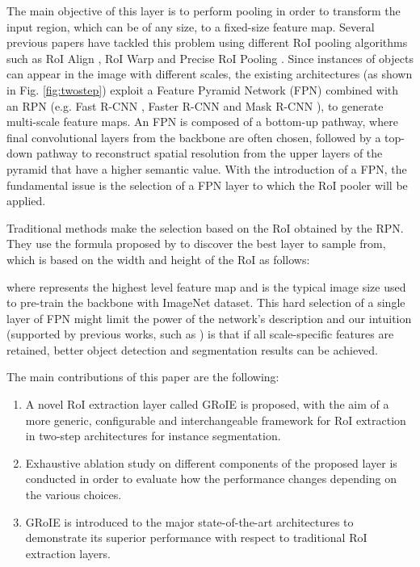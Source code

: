 \documentclass[10pt,conference,a4paper]{IEEEtran}
\begin{document}
The main objective of this layer is to perform pooling in order to transform the input region, which can be of any size, to a fixed-size feature map.
Several previous papers have tackled this problem using different RoI pooling algorithms such as RoI Align \cite{he2017mask}, RoI Warp \cite{dai2016instance} and Precise RoI Pooling \cite{jiang2018acquisition}.
Since instances of objects can appear in the image with different scales, the existing architectures (as shown in Fig. \ref{fig:twostep}) exploit a Feature Pyramid Network (FPN) \cite{lin2017feature} combined with an RPN  (e.g. Fast R-CNN \cite{girshick2015fast}, Faster R-CNN \cite{ren2015faster} and Mask R-CNN \cite{he2017mask}), to generate multi-scale feature maps.
An FPN is composed of a bottom-up pathway, where final convolutional layers from the backbone are often chosen, followed by a top-down pathway to reconstruct spatial resolution from the upper layers of the pyramid that have a higher semantic value.
With the introduction of a FPN, the fundamental issue is the selection of a FPN layer to which the RoI pooler will be applied.

Traditional methods make the selection based on the RoI obtained by the RPN.
They use the formula proposed by \cite{lin2017feature} to discover the best  layer to sample from, which is based on the width  and height  of the RoI as follows:

\noindent where  represents the highest level feature map and  is the typical image size used to pre-train the backbone with ImageNet dataset.
This hard selection of a single layer of FPN might limit the power of the network's description and our intuition (supported by previous works, such as \cite{liu2018path}) is that if all scale-specific features are retained, better object detection and segmentation results can be achieved.

The main contributions of this paper are the following:
\begin{enumerate}
\item A novel RoI extraction layer called GRoIE is proposed, with the aim of a more generic, configurable and interchangeable framework for RoI extraction in two-step architectures for instance segmentation.
\item Exhaustive ablation study on different components of the proposed layer is conducted in order to evaluate how the performance changes depending on the various choices.
\item GRoIE is introduced to the major state-of-the-art architectures to demonstrate its superior performance with respect to traditional RoI extraction layers.
\end{enumerate}
\end{document}
